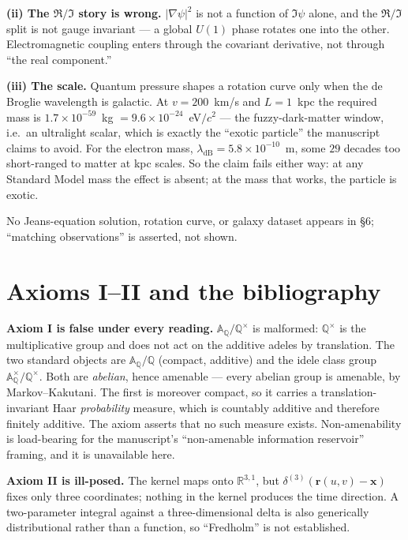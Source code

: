 \documentclass[11pt,a4paper]{article}
\begin{document}
\textbf{(ii) The $\Re/\Im$ story is wrong.} $|\nabla\psi|^2$ is not a function of
$\Im\psi$ alone, and the $\Re/\Im$ split is not gauge invariant --- a global $U(1)$
phase rotates one into the other. Electromagnetic coupling enters through the
covariant derivative, not through ``the real component.''

\textbf{(iii) The scale.} Quantum pressure shapes a rotation curve only when the de
Broglie wavelength is galactic. At $v=200$~km/s and $L=1$~kpc the required mass is
$1.7\times10^{-59}$~kg $=9.6\times10^{-24}$~eV$/c^2$ --- the fuzzy-dark-matter
window, i.e.\ an ultralight scalar, which is exactly the ``exotic particle'' the
manuscript claims to avoid. For the electron mass, $\lambda_{\mathrm{dB}} =
5.8\times10^{-10}$~m, some $29$ decades too short-ranged to matter at kpc scales.
So the claim fails either way: at any Standard Model mass the effect is absent; at
the mass that works, the particle is exotic.

No Jeans-equation solution, rotation curve, or galaxy dataset appears in \S6;
``matching observations'' is asserted, not shown.

\section{Axioms I--II and the bibliography}
\label{sec:citations}

\textbf{Axiom I is false under every reading.} $\mathbb{A}_\mathbb{Q}/\mathbb{Q}^\times$
is malformed: $\mathbb{Q}^\times$ is the multiplicative group and does not act on the
additive adeles by translation. The two standard objects are
$\mathbb{A}_\mathbb{Q}/\mathbb{Q}$ (compact, additive) and the idele class group
$\mathbb{A}_\mathbb{Q}^\times/\mathbb{Q}^\times$. Both are \emph{abelian}, hence
amenable --- every abelian group is amenable, by Markov--Kakutani. The first is
moreover compact, so it carries a translation-invariant Haar \emph{probability}
measure, which is countably additive and therefore finitely additive. The axiom
asserts that no such measure exists. Non-amenability is load-bearing for the
manuscript's ``non-amenable information reservoir'' framing, and it is unavailable
here.

\textbf{Axiom II is ill-posed.} The kernel maps onto $\mathbb{R}^{3,1}$, but
$\delta^{(3)}(\mathbf{r}(u,v)-\mathbf{x})$ fixes only three coordinates; nothing in
the kernel produces the time direction. A two-parameter integral against a
three-dimensional delta is also generically distributional rather than a function,
so ``Fredholm'' is not established.
\end{document}
